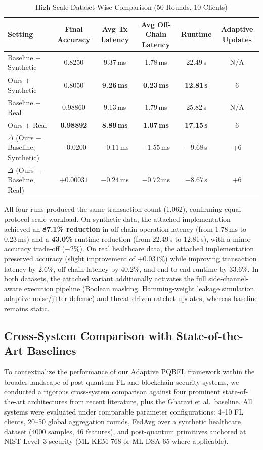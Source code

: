 \documentclass[journal, 10pt, twocolumn]{IEEEtran}
\begin{document}
\begin{table}
\centering
\caption{High-Scale Dataset-Wise Comparison (50 Rounds, 10 Clients)}
\label{tab:comparison_table}
\begin{tabular}{l c c c c c}
\toprule
\textbf{Setting} & \textbf{Final Accuracy} & \textbf{Avg Tx Latency} & \textbf{Avg Off-Chain Latency} & \textbf{Runtime} & \textbf{Adaptive Updates} \\
\midrule
Baseline + Synthetic & 0.8250 & 9.37\,ms & 1.78\,ms & 22.49\,s & N/A \\
Ours + Synthetic & 0.8050 & \textbf{9.26\,ms} & \textbf{0.23\,ms} & \textbf{12.81\,s} & 6 \\
\midrule
Baseline + Real & 0.98860 & 9.13\,ms & 1.79\,ms & 25.82\,s & N/A \\
Ours + Real & \textbf{0.98892} & \textbf{8.89\,ms} & \textbf{1.07\,ms} & \textbf{17.15\,s} & 6 \\
\midrule
$\Delta$ (Ours $-$ Baseline, Synthetic) & $-0.0200$ & $-0.11$\,ms & $-1.55$\,ms & $-9.68$\,s & +6 \\
$\Delta$ (Ours $-$ Baseline, Real) & $+0.00031$ & $-0.24$\,ms & $-0.72$\,ms & $-8.67$\,s & +6 \\
\bottomrule
\end{tabular}
\end{table}

All four runs produced the same transaction count (1,062), confirming equal protocol-scale workload. On synthetic data, the attached implementation achieved an \textbf{87.1\% reduction} in off-chain operation latency (from 1.78\,ms to 0.23\,ms) and a \textbf{43.0\%} runtime reduction (from 22.49\,s to 12.81\,s), with a minor accuracy trade-off ($-2\%$). On real healthcare data, the attached implementation preserved accuracy (slight improvement of $+0.031\%$) while improving transaction latency by 2.6\%, off-chain latency by 40.2\%, and end-to-end runtime by 33.6\%. In both datasets, the attached variant additionally activates the full side-channel-aware execution pipeline (Boolean masking, Hamming-weight leakage simulation, adaptive noise/jitter defense) and threat-driven ratchet updates, whereas baseline remains static.

\subsection{Cross-System Comparison with State-of-the-Art Baselines}
\label{subsec:cross_system}

To contextualize the performance of our Adaptive PQBFL framework within the broader landscape of post-quantum FL and blockchain security systems, we conducted a rigorous cross-system comparison against four prominent state-of-the-art architectures from recent literature, plus the Gharavi et al.\ baseline. All systems were evaluated under comparable parameter configurations: 4--10 FL clients, 20--50 global aggregation rounds, FedAvg over a synthetic healthcare dataset (4000 samples, 46 features), and post-quantum primitives anchored at NIST Level~3 security (ML-KEM-768 or ML-DSA-65 where applicable).
\end{document}
